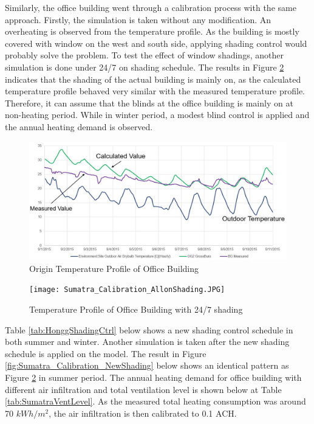 			Similarly, the office building went through a calibration process with the same approach. Firstly, the simulation is taken without any modification. An overheating is observed from the temperature profile. As the building is mostly covered with window on the west and south side, applying shading control would probably solve the problem. To test the effect of window shadings, another simulation is done under 24/7  on shading schedule. The results in Figure \ref{fig:Sumatra_Calibration_Allshade} indicates that the shading of the actual building is mainly on, as the calculated temperature profile behaved very similar with the measured temperature profile. Therefore, it can assume that the blinds at the office building is mainly on at non-heating period. While in winter period, a modest blind control is applied and the annual heating demand is observed.

			\begin{figure}[H]
			\centering
			\includegraphics[scale=0.5]{Figure/Office_Calibration_Ori.JPG}
			\caption{Origin Temperature Profile of Office Building}
			\label{fig:Sumatra_Calibration_Ori}
			\end{figure}
			
			\begin{figure}[h!]
			\centering
			\texttt{[image: Sumatra\_Calibration\_AllonShading.JPG]}
			\caption{Temperature Profile of Office Building with 24/7 shading}
			\label{fig:Sumatra_Calibration_Allshade}
			\end{figure}			
			
			Table \ref{tab:HonggShadingCtrl} below shows a new shading control schedule in both summer and winter. Another simulation is taken after the new shading schedule is applied on the model. The result in Figure \ref{fig:Sumatra_Calibration_NewShading} below shows an identical pattern as Figure \ref{fig:Sumatra_Calibration_Allshade} in summer period. The annual heating demand for office building with different air infiltration and total ventilation level is shown below at Table \ref{tab:SumatraVentLevel}. As the measured total heating consumption was around 70 $kWh/m^2$, the air infiltration is then calibrated to 0.1 ACH.\\
			
